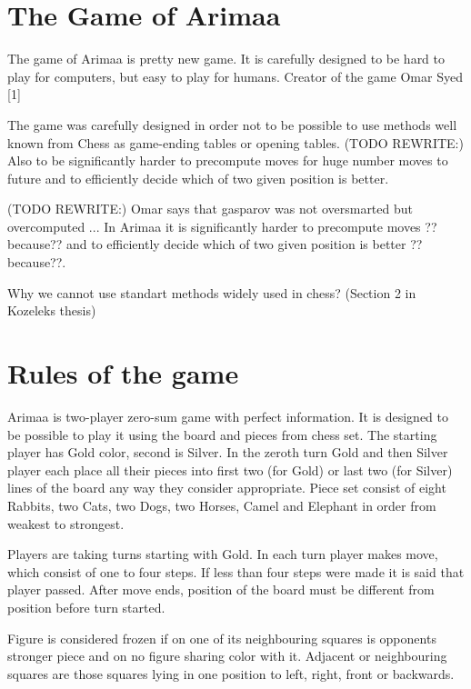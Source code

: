 \section{The Game of Arimaa}
The game of Arimaa is pretty new game. It is carefully designed to be hard to
play for computers, but easy to play for humans. Creator of the game Omar
Syed [1]

The game was carefully designed in order not to be possible to use methods
well known from Chess as game-ending tables or opening tables. (TODO
REWRITE:) Also to be significantly harder to precompute moves for huge
number moves to future and to efficiently decide which of two given position
is better.

(TODO REWRITE:) Omar says that gasparov was not oversmarted but overcomputed ...
In Arimaa it is significantly harder to precompute moves ??because?? and to
efficiently decide which of two given position is better ??because??.

Why we cannot use standart methods widely used in chess? (Section 2 in Kozeleks thesis)

\section{Rules of the game~\cite{arimaa.com}}
Arimaa is two-player zero-sum game with perfect information. It is designed to
be possible to play it using the board and pieces from chess set. The starting
player has Gold color, second is Silver. In the zeroth turn Gold and then
Silver player each place all their pieces into first two (for Gold) or last two
(for Silver) lines of the board any way they consider appropriate. Piece set
consist of eight Rabbits, two Cats, two Dogs, two Horses, Camel and Elephant in
order from weakest to strongest.


Players are taking turns starting with Gold. In each turn player makes move,
which consist of one to four steps. If less than four steps were made it is
said that player passed. After move ends, position of the board must be
different from position before turn started.

Figure is considered frozen if on one of its neighbouring squares is opponents
stronger piece and on no figure sharing color with it. Adjacent or neighbouring
squares are those squares lying in one position to left, right, front or
backwards.


